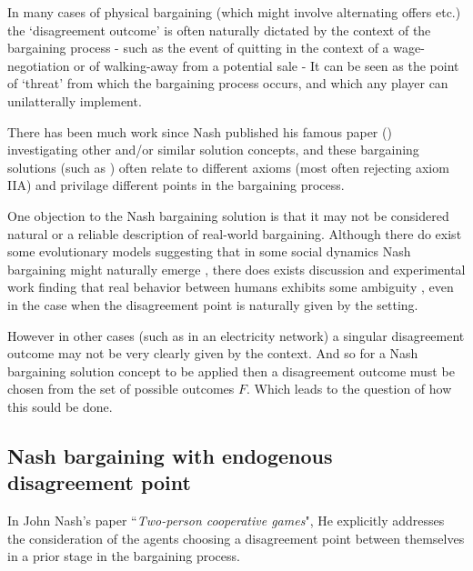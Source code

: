 
In many cases of physical bargaining (which might involve alternating offers etc.) the `disagreement outcome' is often naturally dictated by the context of the bargaining process - 
such as the event of quitting in the context of a wage-negotiation or of walking-away from a potential sale
- It can be seen as the point of `threat' from which the bargaining process occurs, and which any player can unilatterally implement.\cite{nash2}

There has been much work since Nash published his famous paper (\cite{nash1}) investigating other and/or similar solution concepts, and these bargaining solutions (such as \cite{smorodinsky,tempered,tale1,anbarci2002comparing}) often relate to different axioms (most often rejecting axiom IIA) and privilage different points in the bargaining process.

One objection to the Nash bargaining solution is that it may not be considered natural or a reliable description of real-world bargaining.
Although there do exist some evolutionary models suggesting that in some social dynamics Nash bargaining might naturally emerge \cite{articlechoakihiko}, there does exists discussion and experimental work finding that real behavior between humans exhibits some ambiguity \cite{KROLL2014261}, even in the case when the disagreement point is naturally given by the setting.

However in other cases (such as in an electricity network) a singular disagreement outcome may not be very clearly given by the context.
And so for a Nash bargaining solution concept to be applied then a disagreement outcome must be chosen from the set of possible outcomes $F$.
Which leads to the question of how this sould be done.

\subsection{Nash bargaining with endogenous disagreement point}\label{subsec:nash_bargaining_endogenous}

In John Nash's paper ``\textit{Two-person cooperative games}"\cite{nash2}, He explicitly addresses the consideration of the agents choosing a disagreement point between themselves in a prior stage in the bargaining process.

